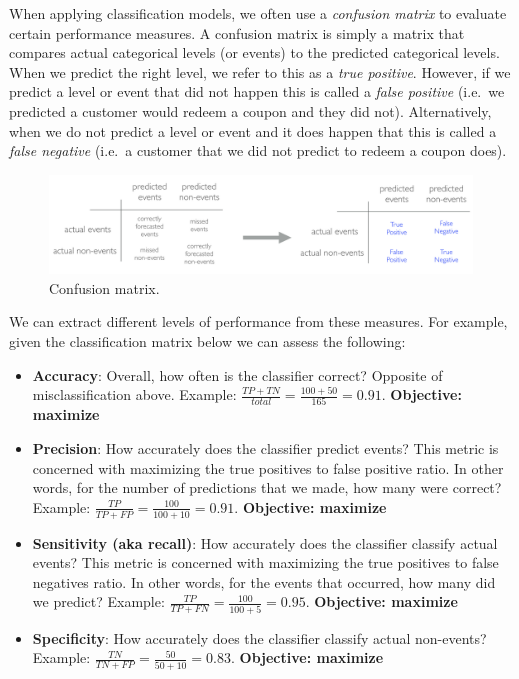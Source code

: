 \documentclass[]{book}
\theoremstyle{definition}
\theoremstyle{definition}
\theoremstyle{definition}
\theoremstyle{remark}
\begin{document}
When applying classification models, we often use a \emph{confusion
matrix} to evaluate certain performance measures. A confusion matrix is
simply a matrix that compares actual categorical levels (or events) to
the predicted categorical levels. When we predict the right level, we
refer to this as a \emph{true positive}. However, if we predict a level
or event that did not happen this is called a \emph{false positive}
(i.e.~we predicted a customer would redeem a coupon and they did not).
Alternatively, when we do not predict a level or event and it does
happen that this is called a \emph{false negative} (i.e.~a customer that
we did not predict to redeem a coupon does).

\begin{figure}

{\centering \includegraphics[width=1\linewidth,height=1\textheight]{illustrations/confusion-matrix} 

}

\caption{Confusion matrix.}\label{fig:confusion-matrix}
\end{figure}

We can extract different levels of performance from these measures. For
example, given the classification matrix below we can assess the
following:

\begin{itemize}
\item
  \textbf{Accuracy}: Overall, how often is the classifier correct?
  Opposite of misclassification above. Example:
  \(\frac{TP + TN}{total} = \frac{100+50}{165} = 0.91\).
  \textbf{Objective: maximize}
\item
  \textbf{Precision}: How accurately does the classifier predict events?
  This metric is concerned with maximizing the true positives to false
  positive ratio. In other words, for the number of predictions that we
  made, how many were correct? Example:
  \(\frac{TP}{TP + FP} = \frac{100}{100+10} = 0.91\). \textbf{Objective:
  maximize}
\item
  \textbf{Sensitivity (aka recall)}: How accurately does the classifier
  classify actual events? This metric is concerned with maximizing the
  true positives to false negatives ratio. In other words, for the
  events that occurred, how many did we predict? Example:
  \(\frac{TP}{TP + FN} = \frac{100}{100+5} = 0.95\). \textbf{Objective:
  maximize}
\item
  \textbf{Specificity}: How accurately does the classifier classify
  actual non-events? Example:
  \(\frac{TN}{TN + FP} = \frac{50}{50+10} = 0.83\). \textbf{Objective:
  maximize}
\end{itemize}
\end{document}
